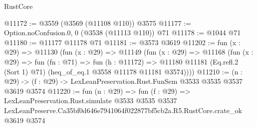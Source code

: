 \begin{lexlean}{RustCore}
\begin{coremodule}
@11172 := @3559 (@3569 (@11108 @110)) @3575
@11177 := Option.noConfusion.{0, 0} (@3538 (@11113 @110)) @71
@11178 := @1044 @71
@11180 := @11177 @11178 @71
@11181 := @3573 @3619
@11202 := fun (x : @29) =>
  @11130
    (fun (x : @29) =>
    @11149
      (fun (x : @29) =>
      @11168
        (fun (x : @29) =>
        fun (fn : @71) =>
        fun (h : @11172) =>
        @11180 @11181 (Eq.refl.{2} (Sort 1) @71) (heq_of_eq.{1} @3558 @11178 @11181 @3574))))
@11210 := (n : @29) -> (f : @29) -> LexLeanPreservation.Rust.FunSem @3533 @3535 @3537 @3619 @3574
@11220 := fun (n : @29) =>
  fun (f : @29) =>
  LexLeanPreservation.Rust.simulate
    @3533
    @3535
    @3537
    LexLeanPreserve.Ca35bf0d646e7941064f022877bf5cb2a.R5.RustCore.crate_ok
    @3619
    @3574
\end{coremodule}
\end{lexlean}
